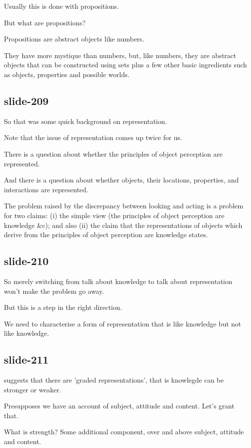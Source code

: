 \documentclass[12pt,\papersize]{extarticle}
\begin{document}
Usually this is done with propositions.
 
But what are propositions?
 
Propositions are abstract objects like numbers.
 
They have more mystique than numbers, but, like numbers, they are abstract objects that can be constructed using sets plus a few other basic ingredients such as objects, properties and possible worlds.
 
\subsection{slide-209}
So that was some quick background on representation.
 
Note that the issue of representation comes up twice for us.
 
There is a question about whether the principles of object perception are represented.
 
And there is a question about whether objects, their locations, properties, and interactions are represented.
 
The problem raised by the discrepancy between looking and acting is a problem for two claims: (i) the simple view (the principles of object perception are knowledge \&c); and also (ii) the claim that the representations of objects which derive from the principles of object perception are knowledge states.
 
\subsection{slide-210}
So merely switching from talk about knowledge to talk about representation won't make the problem go away.
 
But this is a step in the right direction.
 
We need to characterise a form of representation that is like knowledge but not like knowledge.
 
\subsection{slide-211}
\citet{Munakata:2001ch} suggests that there are 'graded representations', that is knowlegde can be stronger or weaker.
 
Presupposes we have an account of subject, attitude and content.  Let's grant that.
 
What is strength?  Some additional component, over and above subject, attitude and content.
 
\end{document}
